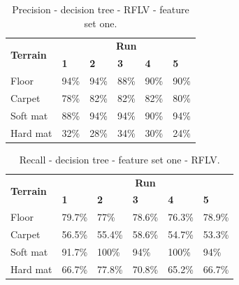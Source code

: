 \documentclass[USenglish]{ifimaster}  %
\begin{document}
\begin{table}[h]
	\begin{subtable}[h]{1\textwidth}
		\centering
		\captionsetup{justification=centering}
		\begin{tabular}{@{}llllll@{}}
			\toprule
			\multirow{2}{*}{\textbf{Terrain}} & \multicolumn{5}{c}{\textbf{Run}} \\ \cmidrule(l){2-6} 
			& \multicolumn{1}{l|}{\textbf{1}} & \multicolumn{1}{l|}{\textbf{2}} & \multicolumn{1}{l|}{\textbf{3}} & \multicolumn{1}{l|}{\textbf{4}} & \textbf{5} \\ \midrule
			\multicolumn{1}{l|}{Floor} & \multicolumn{1}{l|}{94\%} & \multicolumn{1}{l|}{94\%} & \multicolumn{1}{l|}{88\%} & \multicolumn{1}{l|}{90\%} & 90\% \\ \midrule
			\multicolumn{1}{l|}{Carpet} & \multicolumn{1}{l|}{78\%} & \multicolumn{1}{l|}{82\%} & \multicolumn{1}{l|}{82\%} & \multicolumn{1}{l|}{82\%} & 80\% \\ \midrule
			\multicolumn{1}{l|}{Soft mat} & \multicolumn{1}{l|}{88\%} & \multicolumn{1}{l|}{94\%} & \multicolumn{1}{l|}{94\%} & \multicolumn{1}{l|}{90\%} & 94\% \\ \midrule
			\multicolumn{1}{l|}{Hard mat} & \multicolumn{1}{l|}{32\%} & \multicolumn{1}{l|}{28\%} & \multicolumn{1}{l|}{34\%} & \multicolumn{1}{l|}{30\%} & 24\% \\ \bottomrule
		\end{tabular}
		\caption{Precision - decision tree - RFLV - feature set one.}
		\label{dtfilterprecision}
	\end{subtable}
\end{table}
\hfill
\begin{table}[h]\ContinuedFloat
	\begin{subtable}[h]{1\textwidth}
		\centering
		\captionsetup{justification=centering}
	\begin{tabular}{@{}llllll@{}}
		\toprule
		\multirow{2}{*}{\textbf{Terrain}} & \multicolumn{5}{c}{\textbf{Run}} \\ \cmidrule(l){2-6} 
		& \multicolumn{1}{l|}{\textbf{1}} & \multicolumn{1}{l|}{\textbf{2}} & \multicolumn{1}{l|}{\textbf{3}} & \multicolumn{1}{l|}{\textbf{4}} & \textbf{5} \\ \midrule
		\multicolumn{1}{l|}{Floor} & \multicolumn{1}{l|}{79.7\%} & \multicolumn{1}{l|}{77\%} & \multicolumn{1}{l|}{78.6\%} & \multicolumn{1}{l|}{76.3\%} & 78.9\% \\ \midrule
		\multicolumn{1}{l|}{Carpet} & \multicolumn{1}{l|}{56.5\%} & \multicolumn{1}{l|}{55.4\%} & \multicolumn{1}{l|}{58.6\%} & \multicolumn{1}{l|}{54.7\%} & 53.3\% \\ \midrule
		\multicolumn{1}{l|}{Soft mat} & \multicolumn{1}{l|}{91.7\%} & \multicolumn{1}{l|}{100\%} & \multicolumn{1}{l|}{94\%} & \multicolumn{1}{l|}{100\%} & 94\% \\ \midrule
		\multicolumn{1}{l|}{Hard mat} & \multicolumn{1}{l|}{66.7\%} & \multicolumn{1}{l|}{77.8\%} & \multicolumn{1}{l|}{70.8\%} & \multicolumn{1}{l|}{65.2\%} & 66.7\% \\ \bottomrule
	\end{tabular}
	\caption{Recall - decision tree - feature set one - RFLV.}
	\label{dtfilterrecall}
	\end{subtable}
\end{table}
\end{document}
